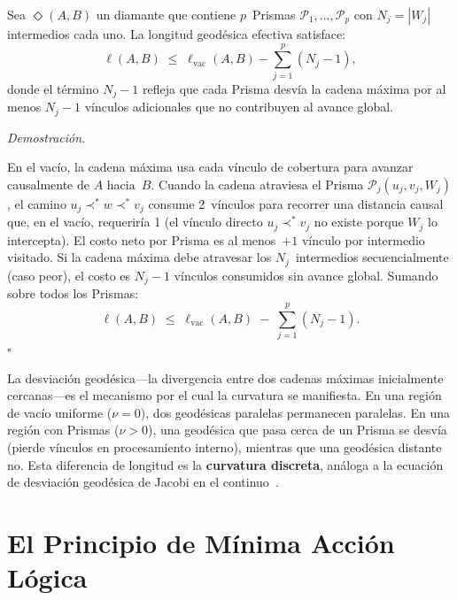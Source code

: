 \documentclass[11pt, a4paper, openany]{book}
\newcommand{\covers}{\prec^{\!*}}
\newcommand{\diam}[2]{\Diamond(#1,#2)}
\renewenvironment{proof}[1][Demostraci\'on]{%
  \par\noindent\textit{#1.}\quad
}{\hfill$\square$\par\medskip}
\begin{document}
\begin{theorem}
\label{thm:geodesic-shortening}
Sea $\diam{A}{B}$ un diamante que contiene $p$~Prismas
$\mathcal{P}_1, \ldots, \mathcal{P}_p$ con
$N_j = |W_j|$ intermedios cada uno. La longitud geod\'esica efectiva
satisface:
\begin{equation}
  \ell(A,B)
  \;\leq\;
  \ell_{\text{vac}}(A,B) - \sum_{j=1}^{p} (N_j - 1),
  \label{eq:geodesic-shortening}
\end{equation}
donde el t\'ermino $N_j - 1$ refleja que cada Prisma desvía la
cadena m\'axima por al menos $N_j - 1$ v\'inculos adicionales que no
contribuyen al avance global.
\end{theorem}

\begin{proof}
En el vac\'io, la cadena m\'axima usa cada v\'inculo de cobertura para
avanzar causalmente de $A$ hacia~$B$. Cuando la cadena atraviesa el
Prisma $\mathcal{P}_j(u_j, v_j, W_j)$, el camino
$u_j \covers w \covers v_j$ consume 2~v\'inculos para
recorrer una distancia causal que, en el vac\'io, requerir\'ia 1
(el v\'inculo directo $u_j \covers v_j$ no existe porque $W_j$
lo intercepta). El costo neto por Prisma es al menos~$+1$ v\'inculo
por intermedio visitado. Si la cadena m\'axima debe atravesar los
$N_j$~intermedios secuencialmente (caso peor), el costo es $N_j - 1$
v\'inculos consumidos sin avance global. Sumando sobre todos los
Prismas:
\[
  \ell(A,B)
  \;\leq\;
  \ell_{\text{vac}}(A,B)
  \;-\; \sum_{j=1}^{p} (N_j - 1).
\]
\end{proof}

\noindent
La desviaci\'on geod\'esica---la divergencia entre dos cadenas
m\'aximas inicialmente cercanas---es el mecanismo por el cual la
curvatura se manifiesta. En una regi\'on de vac\'io uniforme
($\nu = 0$), dos geod\'esicas paralelas permanecen paralelas. En
una regi\'on con Prismas ($\nu > 0$), una geod\'esica que pasa cerca
de un Prisma se desv\'ia (pierde v\'inculos en procesamiento interno),
mientras que una geod\'esica distante no. Esta diferencia de longitud
es la \textbf{curvatura discreta}, an\'aloga a la ecuaci\'on de
desviaci\'on geod\'esica de Jacobi en el
continuo~\cite{wald1984,hawking1973}.

\section{El Principio de M\'inima Acci\'on L\'ogica}
\end{document}
